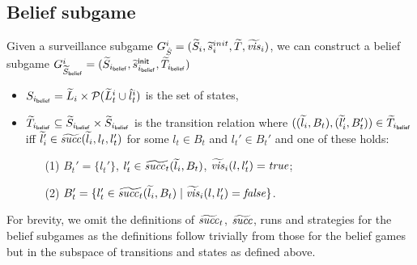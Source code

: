 \subsection{Belief subgame}
Given a surveillance subgame $G^{i}_{\hat{S}} = (\widetilde{S}_i,\widetilde{s}_i^{init},\widetilde{T},\widetilde{\mathit{vis}}_i)$, we can construct a belief subgame $G^{i}_{\widetilde{S}_{\mathsf{belief}}} = (\widetilde{S}_{i_{\mathsf{belief}}},\widetilde{s}^{\mathsf{init}}_{i_{\mathsf{belief}}},\widetilde{T}_{i_{\mathsf{belief}}})$ 

\begin{itemize}
\item $S_{i_{\mathsf{belief}}} = \widetilde{L}_i \times \mathcal{P}(\widetilde{L}^i_t \cup \hat{l}_t^i)$ is the set of states,
\item $\widetilde{T}_{i_{\mathsf{belief}}} \subseteq \widetilde{S}_{i_{\mathsf{belief}}} \times \widetilde{S}_{i_{\mathsf{belief}}}$ is the transition relation where $((\widetilde{l}_i, B_t),(\widetilde{l}_i', B_t')) \in \widetilde{T}_{i_{\mathsf{belief}}}$ iff $\widetilde{l}_i' \in  \widetilde{\mathit{succ}}(\widetilde{l}_i,l_t,l_t')$ for some $l_t \in B_t$ and $l_t' \in B_t'$ and one of these holds:
\begin{itemize}
\item[(1)] $B_t' = \{l_t'\}$, $l_t' \in \widetilde{\mathit{succ}_t}(\widetilde{l}_i,B_t)$, $\widetilde{\mathit{vis}}_i(l,l_t') = \mathit{true}$;
\item[(2)] $B_t' = \{l_t' \in \widetilde{\mathit{succ}_t}(\widetilde{l}_i,B_t)  \mid  \widetilde{\mathit{vis}}_i(l,l_t') = \mathit{false} \}$.
\end{itemize}
\end{itemize}

 For brevity, we omit the definitions of $\widetilde{\mathit{succ}}_t$, $\widetilde{\mathit{succ}}$, runs and strategies for the belief subgames as the definitions follow trivially from those for the belief games but in the subspace of transitions and states as defined above.

